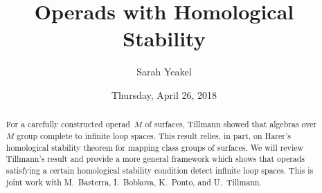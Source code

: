 \documentclass{UAmathtalk}
\author{Sarah Yeakel}
\title{Operads with Homological Stability}
\date{Thursday, April 26, 2018}
\begin{document}
\maketitle

\begin{abstract}
For a carefully constructed operad~$M$ of surfaces, Tillmann showed that algebras over~$M$ group complete to infinite loop spaces. This result relies, in part, on Harer's homological stability theorem for mapping class groups of surfaces. We will review Tillmann's result and provide a more general framework which shows that operads satisfying a certain homological stability condition detect infinite loop spaces. This is joint work with M.~Basterra, I.~Bobkova, K.~Ponto, and U.~Tillmann.
\end{abstract}
\end{document}
